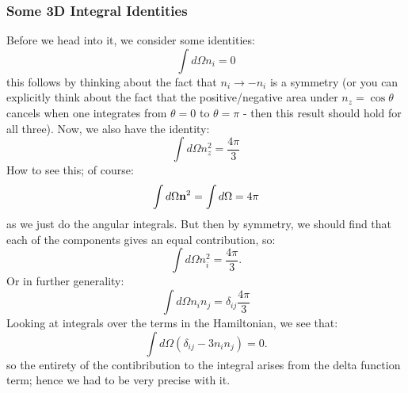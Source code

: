 \subsubsection{Some 3D Integral Identities}
Before we head into it, we consider some identities:
\begin{equation}
    \int d\Omega n_i = 0
\end{equation}
this follows by thinking about the fact that $n_i \to -n_i$ is a symmetry (or you can explicitly think about the fact that the positive/negative area under $n_z = \cos\theta$ cancels when one integrates from $\theta = 0$ to $\theta = \pi$ - then this result should hold for all three). Now, we also have the identity:
\begin{equation}
    \int d\Omega n_z^2 = \frac{4\pi}{3}
\end{equation}
How to see this; of course:
\begin{equation}
    \int d\Omega \mathbf{n}^2 = \int d\Omega = 4\pi
\end{equation}
as we just do the angular integrals. But then by symmetry, we should find that each of the components gives an equal contribution, so:
\begin{equation}
    \int d\Omega n_i^2 = \frac{4\pi}{3}.
\end{equation}
Or in further generality:
\begin{equation}
    \int d\Omega n_in_j = \delta_{ij}\frac{4\pi}{3}
\end{equation}
Looking at integrals over the terms in the Hamiltonian, we see that:
\begin{equation}
    \int d\Omega \left(\delta_{ij} - 3n_in_j\right) = 0.
\end{equation}
so the entirety of the contibribution to the integral arises from the delta function term; hence we had to be very precise with it.

